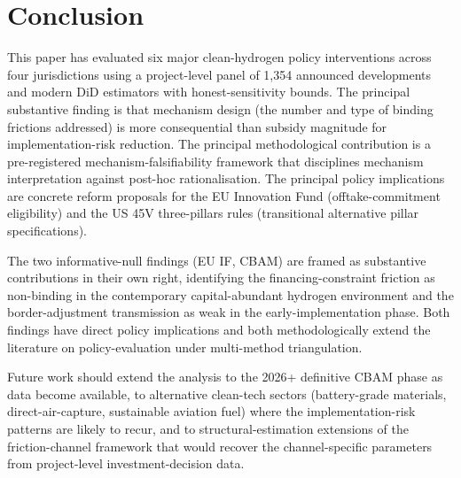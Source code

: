 \documentclass[12pt,a4paper]{article}
\theoremstyle{plain}
\theoremstyle{definition}
\begin{document}
\section{Conclusion}
\label{sec:conclusion}

This paper has evaluated six major clean-hydrogen policy interventions across four jurisdictions using a project-level panel of 1{,}354 announced developments and modern DiD estimators with honest-sensitivity bounds. The principal substantive finding is that mechanism design (the number and type of binding frictions addressed) is more consequential than subsidy magnitude for implementation-risk reduction. The principal methodological contribution is a pre-registered mechanism-falsifiability framework that disciplines mechanism interpretation against post-hoc rationalisation. The principal policy implications are concrete reform proposals for the EU Innovation Fund (offtake-commitment eligibility) and the US 45V three-pillars rules (transitional alternative pillar specifications).

The two informative-null findings (EU IF, CBAM) are framed as substantive contributions in their own right, identifying the financing-constraint friction as non-binding in the contemporary capital-abundant hydrogen environment and the border-adjustment transmission as weak in the early-implementation phase. Both findings have direct policy implications and both methodologically extend the literature on policy-evaluation under multi-method triangulation.

Future work should extend the analysis to the 2026+ definitive CBAM phase as data become available, to alternative clean-tech sectors (battery-grade materials, direct-air-capture, sustainable aviation fuel) where the implementation-risk patterns are likely to recur, and to structural-estimation extensions of the friction-channel framework that would recover the channel-specific parameters from project-level investment-decision data.



\end{document}
